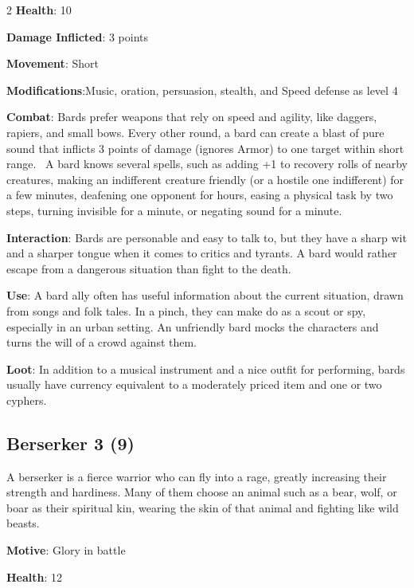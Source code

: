 \begin{multicols}{2}
\textbf{Health}: 10 

\textbf{Damage Inflicted}: 3 points 

\textbf{Movement}: Short 

\textbf{Modifications}:Music, oration, persuasion, stealth, and Speed defense as level 4 

\textbf{Combat}: Bards prefer weapons that rely on speed and agility, like daggers, rapiers, and small bows. Every other round, a bard can create a blast of pure sound that inflicts 3 points of damage (ignores Armor) to one target within short range. 
A bard knows several spells, such as adding +1 to recovery rolls of nearby creatures, making an indifferent creature friendly (or a hostile one indifferent) for a few minutes, deafening one opponent for hours, easing a physical task by two steps, turning invisible for a minute, or negating sound for a minute. 

\textbf{Interaction}: Bards are personable and easy to talk to, but they have a sharp wit and a sharper tongue when it comes to critics and tyrants. A bard would rather escape from a dangerous situation than fight to the death. 

\textbf{Use}: A bard ally often has useful information about the current situation, drawn from songs and folk tales. In a pinch, they can make do as a scout or spy, especially in an urban setting. An unfriendly bard mocks the characters and turns the will of a crowd against them. 

\textbf{Loot}: In addition to a musical instrument and a nice outfit for performing, bards usually have currency equivalent to a moderately priced item and one or two cyphers.

\subsection{Berserker 3 (9)}

A berserker is a fierce warrior who can fly into a rage, greatly increasing their strength and hardiness. Many of them choose an animal such as a bear, wolf, or boar as their spiritual kin, wearing the skin of that animal and fighting like wild beasts. 

\textbf{Motive}: Glory in battle 

\textbf{Health}: 12 


\end{multicols}
